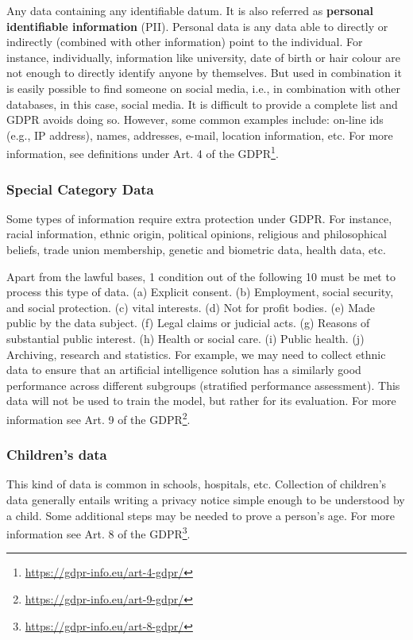 \documentclass[
  12pt,
]{book}
\DeclareRobustCommand{\href}[2]{#2\footnote{\url{#1}}}
\begin{document}
Any data containing any identifiable datum. It is also referred as \textbf{personal identifiable information} (PII).
Personal data is any data able to directly or indirectly (combined with other information) point to the individual.
For instance, individually, information like university, date of birth or hair colour are not enough to directly identify anyone by themselves. But used in combination it is easily possible to find someone on social media, i.e., in combination with other databases, in this case, social media. It is difficult to provide a complete list and GDPR avoids doing so. However, some common examples include: on-line ids (e.g., IP address), names, addresses, e-mail, location information, etc. For more information, see definitions under \href{https://gdpr-info.eu/art-4-gdpr/}{Art. 4 of the GDPR}.

\subsubsection{Special Category Data}\label{special-category-data}

Some types of information require extra protection under GDPR. For instance, racial information, ethnic origin, political opinions, religious and philosophical beliefs, trade union membership, genetic and biometric data, health data, etc.

Apart from the lawful bases, 1 condition out of the following 10 must be met to process this type of data. (a) Explicit consent. (b) Employment, social security, and social protection. (c) vital interests. (d) Not for profit bodies. (e) Made public by the data subject. (f) Legal claims or judicial acts. (g) Reasons of substantial public interest. (h) Health or social care. (i) Public health. (j) Archiving, research and statistics. For example, we may need to collect ethnic data to ensure that an artificial intelligence solution has a similarly good performance across different subgroups (stratified performance assessment). This data will not be used to train the model, but rather for its evaluation. For more information see \href{https://gdpr-info.eu/art-9-gdpr/}{Art. 9 of the GDPR}.

\subsubsection{Children's data}\label{childrens-data}

This kind of data is common in schools, hospitals, etc. Collection of children's data generally entails writing a privacy notice simple enough to be understood by a child. Some additional steps may be needed to prove a person's age. For more information see \href{https://gdpr-info.eu/art-8-gdpr/}{Art. 8 of the GDPR}.
\end{document}
